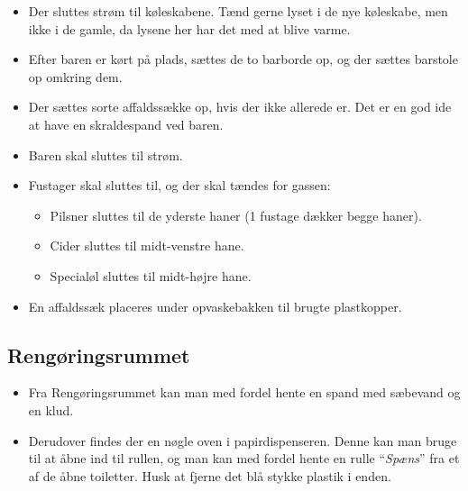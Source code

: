 \begin{itemize}
	\item Der sluttes strøm til køleskabene. Tænd gerne lyset i de nye køleskabe, men ikke i de gamle,
	da lysene her har det med at blive varme.
	\item Efter baren er kørt på plads, sættes de to barborde op, og der sættes barstole op omkring dem.
	\item Der sættes sorte affaldssække op, hvis der ikke allerede er.
		Det er en god ide at have en skraldespand ved baren.
	\item Baren skal sluttes til strøm.
	\item Fustager skal sluttes til, og der skal tændes for gassen:
	\begin{itemize}
		\item Pilsner sluttes til de yderste haner (1 fustage dækker begge
		haner).
		\item Cider sluttes til midt-venstre hane.
		\item Specialøl sluttes til midt-højre hane.
	\end{itemize}
	\item En affaldssæk placeres under opvaskebakken til brugte plastkopper.
\end{itemize}

\subsection{Rengøringsrummet}
\label{sec:pre:rengøring}
\begin{itemize}
	\item Fra Rengøringsrummet kan man med fordel hente en spand med sæbevand og en klud.
	\item Derudover findes der en nøgle oven i papirdispenseren. Denne kan man bruge til
	at åbne ind til rullen, og man kan med fordel hente en rulle ``\textit{Spæns}''
	fra et af de åbne toiletter. Husk at fjerne det blå stykke plastik i enden.
\end{itemize}
